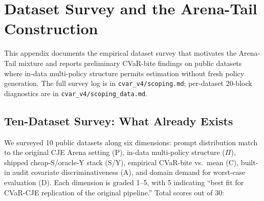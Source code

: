 \section{Dataset Survey and the Arena-Tail Construction}
\label{app:dataset}

This appendix documents the empirical dataset survey that motivates the
Arena-Tail mixture and reports preliminary CVaR-bite findings on
public datasets where in-data multi-policy structure permits estimation
without fresh policy generation. The full survey log is in
\texttt{cvar\_v4/scoping.md}; per-dataset 20-block diagnostics are in
\texttt{cvar\_v4/scoping\_data.md}.

\subsection{Ten-Dataset Survey: What Already Exists}
\label{app:dataset:survey}

We surveyed 10 public datasets along six dimensions: prompt
distribution match to the original CJE Arena setting (P), in-data
multi-policy structure (\(\Pi\)), shipped cheap-S/oracle-Y stack (S/Y),
empirical CVaR-bite vs.\ mean (C), built-in audit covariate
discriminativeness (A), and domain demand for worst-case evaluation
(D). Each dimension is graded 1--5, with 5 indicating ``best fit for
CVaR-CJE replication of the original pipeline.'' Total scores out of
30:

